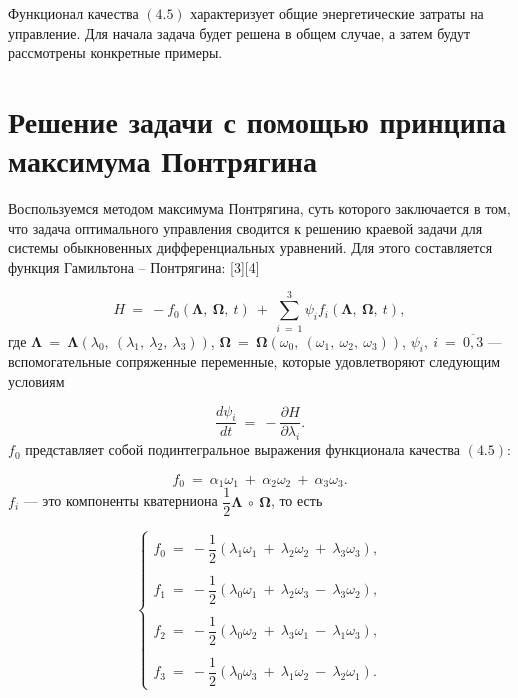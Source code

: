 \documentclass[14pt]{extreport}
\begin{document}
Функционал качества $(4.5)$ характеризует общие энергетические затраты на управление.
Для начала задача будет решена в общем случае, а затем будут рассмотрены конкретные примеры.

\newpage

\chapter{Решение задачи с помощью принципа максимума Понтрягина}


Воспользуемся методом максимума Понтрягина, суть которого заключается в том, что задача оптимального управления сводится к решению краевой задачи
для системы обыкновенных дифференциальных уравнений. Для этого составляется функция Гамильтона -- Понтрягина: [3][4]

\begin{equation}
H\ =\ - f_0(\boldsymbol\Lambda,\ \boldsymbol\Omega,\ t)\ +\ \sum_{i\ =\ 1}^{3}\psi_i f_i(\boldsymbol\Lambda,\ \boldsymbol\Omega,\ t),
\end{equation}
где $\boldsymbol\Lambda\ =\ \boldsymbol\Lambda(\lambda_0,\ (\lambda_1,\ \lambda_2,\ \lambda_3))$,
$\boldsymbol\Omega\ =\ \boldsymbol\Omega(\omega_0,\ (\omega_1,\ \omega_2,\ \omega_3))$,
$\psi_i,\ i\ =\ \overline{0,3}$ --- вспомогательные сопряженные переменные, которые удовлетворяют следующим условиям

\begin{equation}
\dfrac{d\psi_i}{dt}\ =\ -\dfrac{\partial H}{\partial \lambda_i}.
\end{equation}
$f_0$ представляет собой подинтегральное выражения функционала качества $(4.5)$:

\begin{equation}
f_0\ =\ \alpha_1\omega_1\ +\ \alpha_2\omega_2\ +\ \alpha_3\omega_3.
\end{equation}
$f_i$ --- это компоненты кватерниона $\dfrac{1}{2}\boldsymbol\Lambda\ \circ\ \boldsymbol\Omega$, то есть

\begin{equation}
\begin{cases}
f_0\ =\ -\dfrac{1}{2}(\lambda_1\omega_1\ +\ \lambda_2\omega_2\ +\ \lambda_3\omega_3), \\ \\
f_1\ =\ -\dfrac{1}{2}(\lambda_0\omega_1\ +\ \lambda_2\omega_3\ -\ \lambda_3\omega_2), \\ \\ 
f_2\ =\ -\dfrac{1}{2}(\lambda_0\omega_2\ +\ \lambda_3\omega_1\ -\ \lambda_1\omega_3), \\ \\
f_3\ =\ -\dfrac{1}{2}(\lambda_0\omega_3\ +\ \lambda_1\omega_2\ -\ \lambda_2\omega_1). 
 \end{cases}
\end{equation}
\newline
\end{document}
